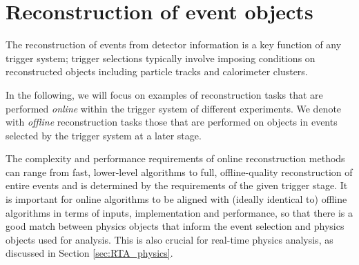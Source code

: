 \section{Reconstruction of event objects}

The reconstruction of events from detector information is a key function of any trigger system; trigger selections typically involve imposing conditions on reconstructed objects including particle tracks and calorimeter clusters. 

In the following, we will focus on examples of reconstruction tasks that are performed \textit{online} within the trigger system of different experiments. 
We denote with \textit{offline} reconstruction tasks those that are performed on objects in events selected by the trigger system at a later stage.  

The complexity and performance requirements of online reconstruction methods can range from fast, lower-level algorithms to full, offline-quality reconstruction of entire events and is determined by the requirements of the given trigger stage. 
It is important for online algorithms to be aligned with (ideally identical to) offline algorithms in terms of inputs, implementation and performance, so that there is a good match between physics objects that inform the event selection and physics objects used for analysis. 
This is also crucial for real-time physics analysis, as discussed in Section \ref{sec:RTA_physics}. 





